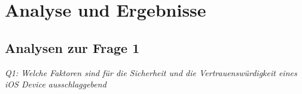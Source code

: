 %
%
%
% 


\chapter{Analyse und Ergebnisse}
\label{ch:Ergebnisse}


\section{Analysen zur Frage 1}
\label{sec:Frage1}

\textit{\glqq Q1: Welche Faktoren sind für die Sicherheit und die Vertrauenswürdigkeit eines iOS Device ausschlaggebend \grqq{}}

